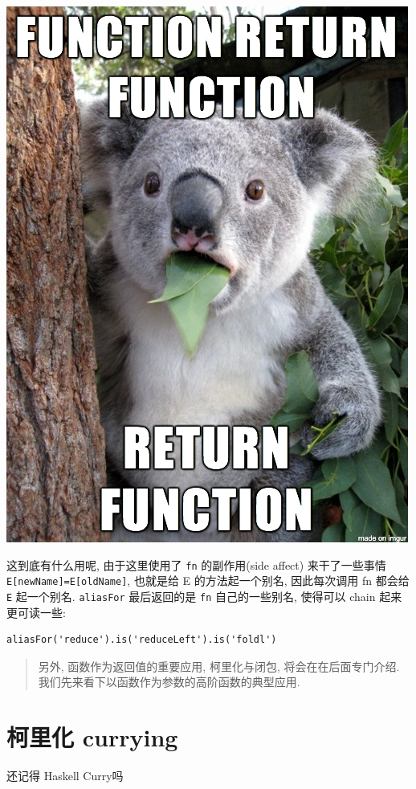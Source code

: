 \documentclass[a5paper]{book}
\begin{document}
\includegraphics[width=.9\linewidth]{./images/higherorder/1qUCC8s.png}

这到底有什么用呢, 由于这里使用了 \texttt{fn} 的副作用(side affect)
来干了一些事情 \texttt{E[newName]=E[oldName]}, 也就是给 E 的方法起一个别名,
因此每次调用 fn 都会给 \texttt{E} 起一个别名. \texttt{aliasFor} 最后返回的是 \texttt{fn}
自己的一些别名, 使得可以 chain 起来更可读一些:

\begin{verbatim}
aliasFor('reduce').is('reduceLeft').is('foldl')
\end{verbatim}

\begin{quote}
另外, 函数作为返回值的重要应用, 柯里化与闭包,
将会在在后面专门介绍. 我们先来看下以函数作为参数的高阶函数的典型应用.
\end{quote}

\chapter{柯里化 currying}
\label{sec:orgheadline19}

还记得 Haskell Curry吗
\end{document}
